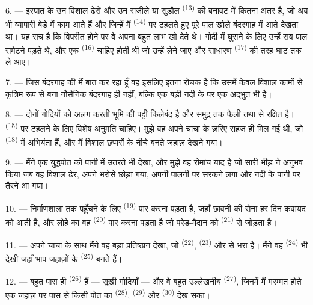 6. --- इस्पात के उन विशाल ढेरों और उन सजीले  या सुडौल
 \textsuperscript{(13)} की बनावट में कितना अंतर है, जो अब
भी व्यापारी बेड़े में काम आते हैं और जिन्हें मैं 
\textsuperscript{(14)} पर टहलते हुए पूरे पाल खोले बंदरगाह में आते देखता था। यह सच
है कि  विपरीत होने पर वे अपना बहुत लाभ खो देते थे। गोदी में घुसने के
लिए उन्हें सब पाल समेटने पड़ते थे, और एक 
\textsuperscript{(16)} चाहिए होती थी जो उन्हें लेने जाए और साधारण
 \textsuperscript{(17)} की तरह घाट तक ले आए।

\VUsaut{3.0mm}
\VUsaut{3.0mm}

7. --- जिस बंदरगाह की मैं बात कर रहा हूँ वह इसलिए इतना रोचक है कि उसमें केवल
विशाल कामों से कृत्रिम रूप से बना नौसैनिक बंदरगाह ही नहीं, बल्कि एक बड़ी नदी के
 पर एक अद्भुत  भी है।

8. --- दोनों गोदियों को अलग करती भूमि की पट्टी किलेबंद है और समुद्र तक फैली
 तथा  से रक्षित है। 
\textsuperscript{(15)} पर टहलने के लिए विशेष अनुमति चाहिए। मुझे वह अपने चाचा के
ज़रिए सहज ही मिल गई थी, जो  \textsuperscript{(18)} में
अभियंता हैं, और मैं विशाल छप्परों के नीचे बनते जहाज़ देखने गया।

9. --- मैंने एक युद्धपोत को पानी में उतरते भी देखा, और मुझे वह रोमांच याद है जो
सारी भीड़ ने अनुभव किया जब वह विशाल ढेर, अपने भरोसे छोड़ा गया, अपनी पालनी पर
सरकने लगा और नदी के पानी पर तैरने आ गया।

10. --- निर्माणशाला तक पहुँचने के लिए  \textsuperscript{(19)}
पार करना पड़ता है, जहाँ छावनी की सेना हर दिन कवायद को आती है, और लोहे का वह
 \textsuperscript{(20)} पार करना पड़ता है जो परेड-मैदान को
 \textsuperscript{(21)} से जोड़ता है।

\VUsaut{3.0mm}
\VUsaut{3.0mm}

11. --- अपने चाचा के साथ मैंने वह बड़ा प्रतिष्ठान देखा, जो 
\textsuperscript{(22)},  \textsuperscript{(23)} और  से
भरा है। मैंने वह  \textsuperscript{(24)} भी देखी जहाँ भाप-जहाज़ों
के  \textsuperscript{(25)} बनते हैं।

12. --- बहुत पास ही  \textsuperscript{(26)} हैं — सूखी गोदियाँ —
और वे बहुत उल्लेखनीय  \textsuperscript{(27)}, जिनमें मैं
मरम्मत होते एक जहाज़ पर पास से किसी पोत का  \textsuperscript{(28)},
 \textsuperscript{(29)} और  \textsuperscript{(30)} देख
सका।


